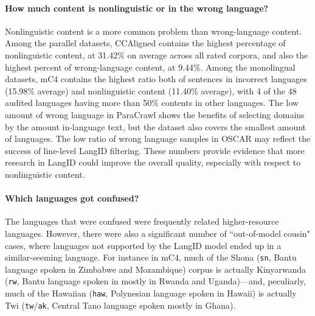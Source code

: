 \paragraph{How much content is nonlinguistic or in the wrong language?}
Nonlinguistic content is a more common problem than wrong-language content. Among the parallel datasets, CCAligned contains the highest percentage of nonlinguistic content, at 31.42\% on average across all rated corpora, and also the highest percent of wrong-language content, at 9.44\%. Among the monolingual datasets, mC4 contains the highest ratio both of sentences in incorrect languages (15.98\% average) and nonlinguistic content (11.40\% average), with 4 of the 48 audited languages having more than 50\% contents in other languages. The low amount of wrong language in ParaCrawl shows the benefits of selecting domains by the amount in-language text, but the dataset also covers the smallest amount of languages. The low ratio of wrong language samples in OSCAR may reflect the success of line-level LangID filtering.
These numbers provide evidence that more research in LangID could improve the overall quality, especially with respect to nonlinguistic content.

\paragraph{Which languages got confused?} The languages that were confused were frequently related higher-resource languages. However, there were also a significant number of ``out-of-model cousin" cases, where languages not supported by the LangID model ended up in a similar-seeming language. For instance in mC4, much of the Shona (\texttt{sn}, Bantu language spoken in Zimbabwe and Mozambique) corpus is actually Kinyarwanda (\texttt{rw}, Bantu language spoken in mostly in Rwanda and Uganda)---and, peculiarly, much of the Hawaiian (\texttt{haw}, Polynesian language spoken in Hawaii) is actually Twi (\texttt{tw}/\texttt{ak}, Central Tano language spoken mostly in Ghana).

